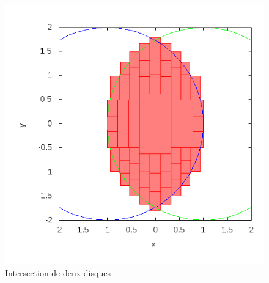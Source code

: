\begin{figure}[ht!] %
  \center
\includegraphics[scale=0.50]{img/disk-disk}
  \caption{Intersection de deux disques} %
 \label{fig:DisqueDisque} %
\end{figure} %
\clearpage
